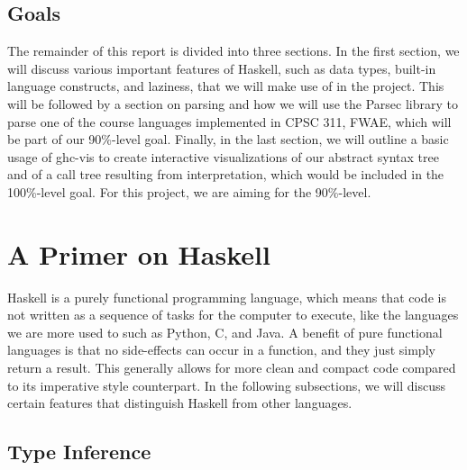 \documentclass[format=acmlarge, review=false, nonacm=false, screen=true]{acmart}
\begin{document}

\subsection{Goals}
The remainder of this report is divided into three sections. In the first section, we will discuss various important features of Haskell, such as data types, built-in language constructs, and laziness, that we will make use of in the project. This will be followed by a section on parsing and how we will use the Parsec library to parse one of the course languages implemented in CPSC 311, FWAE, which will be part of our 90\%-level goal. Finally, in the last section, we will outline a basic usage of ghc-vis to create interactive visualizations of our abstract syntax tree and of a call tree resulting from interpretation, which would be included in the 100\%-level goal. For this project, we are aiming for the 90\%-level.

\section{A Primer on Haskell}
Haskell is a purely functional programming language, which means that code is not written as a sequence of tasks for the computer to execute, like the languages we are more used to such as Python, C, and Java. A benefit of pure functional languages is that no side-effects can occur in a function, and they just simply return a result. This generally allows for more clean and compact code compared to its imperative style counterpart. In the following subsections, we will discuss certain features that distinguish Haskell from other languages.

\subsection{Type Inference}
\end{document}
